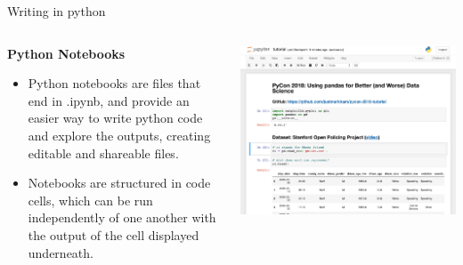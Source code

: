 \documentclass[aspectratio=169]{beamer}
\begin{document}
\begin{frame}{Writing in python}
	\begin{columns}
	
	\begin{column}{0.6\textwidth}
	
		\textbf{Python Notebooks}
		
		\begin{itemize}	

		\item Python notebooks are files that end in .ipynb, and provide an easier way to write python code and explore the outputs, creating editable and shareable files. 
		\item Notebooks are structured in code cells, which can be run independently of one another with the output of the cell displayed underneath.
	\end{itemize}
		
	\end{column}
	
		\begin{column}{0.4\textwidth}
		
		\includegraphics[scale=.6]{graphics/notebook.png}
			
	\end{column}
	\end{columns}
\end{frame}

\begin{frame}{A brief tour of Python}

\centering
{\href{https://github.com/jackminchin/te-python/blob/main/examples/PythonForTE.ipynb}{Live Example}
	
\end{frame}
\end{document}
